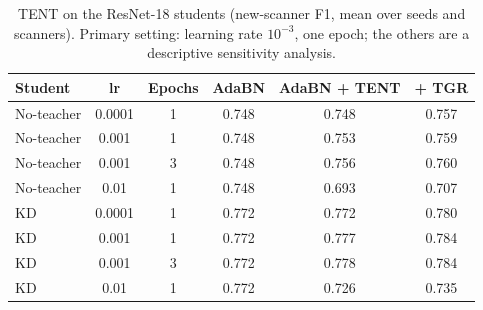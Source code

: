 \begin{table}[htbp]
{\caption{TENT on the ResNet-18 students (new-scanner F1, mean over seeds and scanners). Primary setting: learning rate $10^{-3}$, one epoch; the others are a descriptive sensitivity analysis.}}
{%
\footnotesize
\setlength{\tabcolsep}{5pt}
\begin{tabular}{@{}lccccc@{}}
\toprule
Student & lr & Epochs & AdaBN & AdaBN + TENT & + TGR \\
\midrule
No-teacher & 0.0001 & 1 & 0.748 & 0.748 & 0.757 \\
No-teacher & 0.001 & 1 & 0.748 & 0.753 & 0.759 \\
No-teacher & 0.001 & 3 & 0.748 & 0.756 & 0.760 \\
No-teacher & 0.01 & 1 & 0.748 & 0.693 & 0.707 \\
KD & 0.0001 & 1 & 0.772 & 0.772 & 0.780 \\
KD & 0.001 & 1 & 0.772 & 0.777 & 0.784 \\
KD & 0.001 & 3 & 0.772 & 0.778 & 0.784 \\
KD & 0.01 & 1 & 0.772 & 0.726 & 0.735 \\
\bottomrule
\end{tabular}
}
\end{table}
